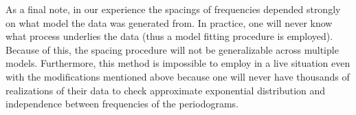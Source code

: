 \documentclass{article}\usepackage[]{graphicx}\usepackage[]{color}
\theoremstyle{plain}
\begin{document}
As a final note, in our experience the spacings of frequencies depended strongly on what model the data was generated from. In practice, one will never know what process underlies the data (thus a model fitting procedure is employed). Because of this, the spacing procedure will not be generalizable across multiple models. Furthermore, this method is impossible to employ in a live situation even with the modifications mentioned above because one will never have thousands of realizations of their data to check approximate exponential distribution and independence between frequencies of the periodograms.


\printbibliography
\end{document}
